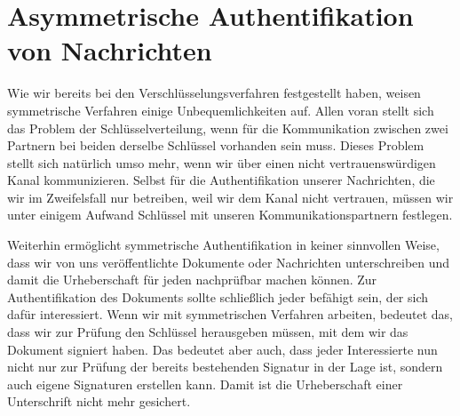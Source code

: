 \chapter{Asymmetrische Authentifikation von Nachrichten}
\label{cha:asymmauth}

Wie wir bereits bei den Verschlüsselungsverfahren festgestellt haben, weisen symmetrische Verfahren einige Unbequemlichkeiten auf. Allen voran stellt sich das Problem der Schlüsselverteilung, wenn für die Kommunikation zwischen zwei Partnern bei beiden derselbe Schlüssel vorhanden sein muss. Dieses Problem stellt sich natürlich umso mehr, wenn wir über einen nicht vertrauenswürdigen Kanal kommunizieren. Selbst für die Authentifikation unserer Nachrichten, die wir im Zweifelsfall nur betreiben, weil wir dem Kanal nicht vertrauen, müssen wir unter einigem Aufwand Schlüssel mit unseren Kommunikationspartnern festlegen.

Weiterhin ermöglicht symmetrische Authentifikation in keiner sinnvollen Weise, dass wir von uns veröffentlichte Dokumente oder Nachrichten unterschreiben und damit die Urheberschaft für jeden nachprüfbar machen können. Zur Authentifikation des Dokuments sollte schließlich jeder befähigt sein, der sich dafür interessiert. Wenn wir mit symmetrischen Verfahren arbeiten, bedeutet das, dass wir zur Prüfung den Schlüssel herausgeben müssen, mit dem wir das Dokument signiert haben. Das bedeutet aber auch, dass jeder Interessierte nun nicht nur zur Prüfung der bereits bestehenden Signatur in der Lage ist, sondern auch eigene Signaturen erstellen kann. Damit ist die Urheberschaft einer Unterschrift nicht mehr gesichert.

